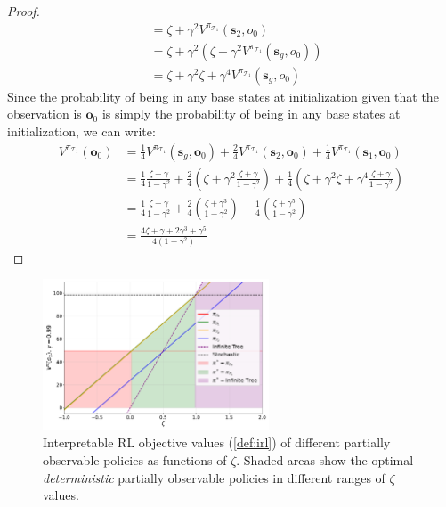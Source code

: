 \begin{proof}
\begin{align*}
        &= \zeta + \gamma^2 V^{\pi_{\mathcal{T}_1}} (\boldsymbol{s}_2, o_0) \\
        &= \zeta + \gamma^2 (\zeta + \gamma^2 V^{\pi_{\mathcal{T}_1}} (\boldsymbol{s}_g, o_0)) \\
        &= \zeta + \gamma^2 \zeta + \gamma^4 V^{\pi_{\mathcal{T}_1}} (\boldsymbol{s}_g, o_0)
    \end{align*}
    Since the probability of being in any base states at initialization given that the observation is $\boldsymbol{o}_0$ is simply the probability of being in any base states at initialization, we can write:
    \begin{align*}
        V^{\pi_{\mathcal{T}_1}} (\boldsymbol{o}_0) &= \frac{1}{4} V^{\pi_{\mathcal{T}_1}} (\boldsymbol{s}_g, \boldsymbol{o}_0) + \frac{2}{4} V^{\pi_{\mathcal{T}_1}} (\boldsymbol{s}_2, \boldsymbol{o}_0) + \frac{1}{4} V^{\pi_{\mathcal{T}_1}} (\boldsymbol{s}_1, \boldsymbol{o}_0) \\
        &= \frac{1}{4} \frac{\zeta + \gamma}{1 - \gamma^2} + \frac{2}{4} (\zeta + \gamma^2 \frac{\zeta + \gamma}{1 - \gamma^2}) + \frac{1}{4} (\zeta + \gamma^2 \zeta + \gamma^4 \frac{\zeta + \gamma}{1 - \gamma^2}) \\
        &= \frac{1}{4} \frac{\zeta + \gamma}{1 - \gamma^2} + \frac{2}{4} (\frac{\zeta + \gamma ^ 3}{1-\gamma^2}) + \frac{1}{4}(\frac{\zeta+\gamma^5}{1-\gamma^2}) \\
        &= \frac{4\zeta + \gamma + 2\gamma^3 + \gamma^5}{4(1-\gamma^2)}
    \end{align*}
    \end{proof}
    \begin{figure}
        \centering
        \includegraphics[width=0.6\textwidth]{images/images_part1/objective_values_plot.pdf}
        \caption{Interpretable RL objective values (\ref{def:irl}) of different partially observable policies as functions of $\zeta$. Shaded areas show the optimal \textit{deterministic} partially observable policies in different ranges of $\zeta$ values.}\label{fig:objectives}
    \end{figure}
